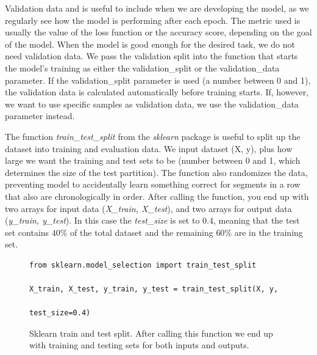 Validation data and is useful to include when we are developing the model, as we regularly see how the model is performing after each epoch. The metric used is usually the value of the loss function or the accuracy score, depending on the goal of the model. When the model is good enough for the desired task, we do not need validation data. We pass the validation split into the function that starts the model's training as either the validation\_split or the validation\_data parameter. If the validation\_split parameter is used (a number between 0 and 1), the validation data is calculated automatically before training starts. If, however, we want to use specific samples as validation data, we use the validation\_data parameter instead.

The function \textit{train\_test\_split} from the \textit{sklearn} package is useful to split up the dataset into training and evaluation data. We input dataset (X, y), plus how large we want the training and test sets to be (number between 0 and 1, which determines the size of the test partition). The function also randomizes the data, preventing model to accidentally learn something correct for segments in a row that also are chronologically in order. After calling the function, you end up with two arrays for input data (\textit{X\_train, X\_test}), and two arrays for output data (\textit{y\_train, y\_test}). In this case the \textit{test\_size} is set to $0.4$, meaning that the test set contains $40\%$ of the total dataset and the remaining $60\%$ are in the training set.

\begin{figure}[h]
\begin{code}
    \begin{verbatim}
from sklearn.model_selection import train_test_split

X_train, X_test, y_train, y_test = train_test_split(X, y, 
                                                    test_size=0.4)
    \end{verbatim}
    \caption{Sklearn train and test split. After calling this function we end up with training and testing sets for both inputs and outputs.}
    \label{code:sklearn_train_test_split}
\end{code}
\end{figure}

